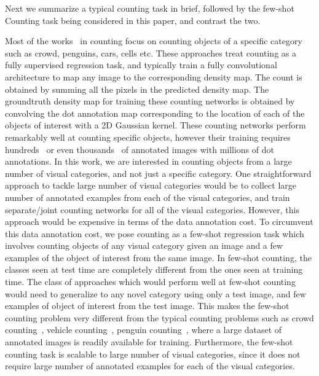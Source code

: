Next we summarize a typical counting task in brief, followed by the few-shot Counting task being considered in this paper, and contrast the two.

Most of the works~\cite{zhang2016single,idrees2018composition,ma2019bayesian,arteta2016counting} in counting focus on counting objects of a specific category such as crowd, penguins, cars, cells etc. These approaches treat counting as a fully supervised regression task, and typically train a fully convolutional architecture to map any image to the corresponding density map. The count is obtained by summing all the pixels in the predicted density map. The groundtruth density map for training these counting networks is obtained by convolving the dot annotation map corresponding to the location of each of the objects of interest with a 2D Gaussian kernel. These counting networks perform remarkably well at counting specific objects, however their training requires hundreds~\cite{zhang2016single} or even thousands~\cite{idrees2018composition,wang2020nwpu,sindagi2020jhu} of annotated images
with millions of dot annotations.
In this work, we are interested in counting objects from a large number of visual categories, and not just a specific category. One straightforward approach to tackle large number of visual categories would be to collect large number of annotated examples from each of the visual categories, and train separate/joint counting networks for all of the visual categories. However, this approach would be expensive in terms of the data annotation cost. To circumvent this data annotation cost, we pose counting as a few-shot regression task which involves counting objects of any visual category given an image and a few examples of the object of interest from the same image. In few-shot counting, the classes seen at test time are completely different from the ones seen at training time. The class of approaches which would perform well at few-shot counting would need to generalize to any novel category using only a test image, and few examples of object of interest from the test image. This makes the few-shot counting problem very different from the typical counting problems such as crowd counting~\cite{zhang2016single,sindagi2020jhu,idrees2018composition,wang2020nwpu}, vehicle counting~\cite{hsieh2017drone}, penguin counting~\cite{arteta2016counting}, where a large dataset of annotated images is readily available for training. Furthermore, the few-shot counting task is scalable to large number of visual categories, since it does not require large number of annotated examples for each of the visual categories.  
\fi

